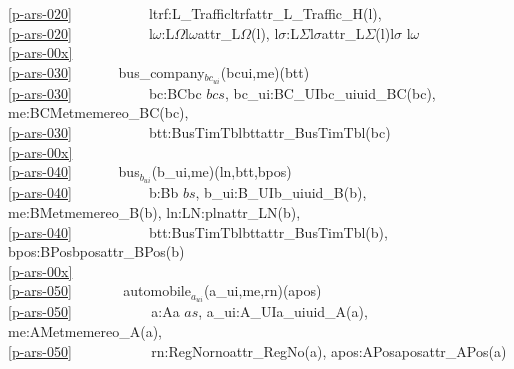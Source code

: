 {\ref{p-ars-020}\ \ \ \ \ \ \ \ \ \ \ ltrf:L\_Traffic{\RDOT}ltrf{\EQ}attr\_L\_Traffic\_H(l),\\
\ref{p-ars-020}\ \ \ \ \ \ \ \ \ \ \ l$\omega$:L$\Omega${\RDOT}l$\omega${\EQ}attr\_L$\Omega$(l), l$\sigma$:L$\Sigma${\RDOT}l$\sigma${\EQ}attr\_L$\Sigma$(l){\WEDGE}l$\sigma$ {\ISIN} l$\omega$ {\RBRACE}\ \ \ \\
\ref{p-ars-00x}\ \ \ \ \ \ {\PARL}\ \ \\
\ref{p-ars-030}\ \ \ \ \ \ {\PARL} {\LBRACE} bus\_company$_{bc_{ui}}$(bcui,me)(btt)\\
\ref{p-ars-030}\ \ \ \ \ \ \ \ \ \ \ bc:BC{\RDOT}bc {\ISIN} $bcs$, bc\_ui:BC\_UI{\RDOT}bc\_ui{\EQ}uid\_BC(bc), me:BCMet{\RDOT}me{\EQ}mereo\_BC(bc),\\
\ref{p-ars-030}\ \ \ \ \ \ \ \ \ \ \ btt:BusTimTbl{\RDOT}btt{\EQ}attr\_BusTimTbl(bc) {\RBRACE}\ \ \\
\ref{p-ars-00x}\ \ \ \ \ \ {\PARL}\ \ \\
\ref{p-ars-040}\ \ \ \ \ \ {\PARL} {\LBRACE} bus$_{b_{ui}}$(b\_ui,me)(ln,btt,bpos) \\
\ref{p-ars-040}\ \ \ \ \ \ \ \ \ \ \ b:B{\RDOT}b {\ISIN} $bs$, b\_ui:B\_UI{\RDOT}b\_ui{\EQ}uid\_B(b), me:BMet{\RDOT}me{\EQ}mereo\_B(b), ln:LN:pln{\EQ}attr\_LN(b),\ \ \\
\ref{p-ars-040}\ \ \ \ \ \ \ \ \ \ \ btt:BusTimTbl{\RDOT}btt{\EQ}attr\_BusTimTbl(b), bpos:BPos{\RDOT}bpos{\EQ}attr\_BPos(b) {\RBRACE}\ \ \\
\ref{p-ars-00x}\ \ \ \,\ \ \ {\PARL}\ \ \\
\ref{p-ars-050}\ \ \ \,\,\ \ \ {\PARL} {\LBRACE} automobile$_{a_{ui}}$(a\_ui,me,rn)(apos) \\
\ref{p-ars-050}\ \ \ \,\ \ \ \ \ \ \ \ a:A{\RDOT}a {\ISIN} $as$, a\_ui:A\_UI{\RDOT}a\_ui{\EQ}uid\_A(a), me:AMet{\RDOT}me{\EQ}mereo\_A(a), \\
\ref{p-ars-050}\ \ \ \,\ \ \ \ \ \ \ \ rn:RegNo{\RDOT}rno{\EQ}attr\_RegNo(a), apos:APos{\RDOT}apos{\EQ}attr\_APos(a) {\RBRACE}\ \ \eox\ \ 
\ep
}\normalsize\HHHH\rm

\label{p-ch.Running Systems.n}%

\label{p-ch:Road Transport.n}